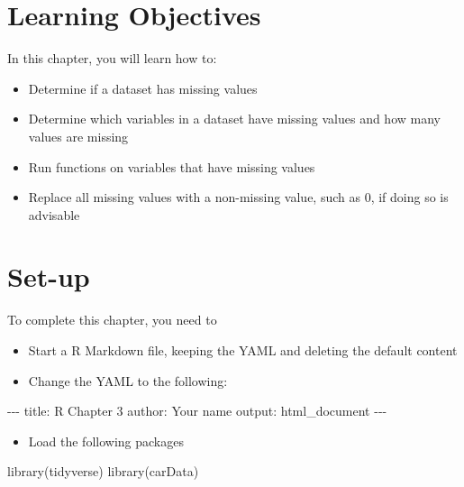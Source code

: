 \documentclass[
]{book}
\makeatletter
\newenvironment{Shaded}{\begin{snugshade}}{\end{snugshade}}
\newcommand{\FunctionTok}[1]{\textcolor[rgb]{0,0,0}{#1}}
\newcommand{\NormalTok}[1]{#1}
\newcommand{\SpecialCharTok}[1]{\textcolor[rgb]{0,0,0}{#1}}
\newcommand{\StringTok}[1]{\textcolor[rgb]{0.5,0.5,0.5}{#1}}
\providecommand{\tightlist}{%
  \setlength{\itemsep}{0pt}\setlength{\parskip}{0pt}}
\newenvironment{kframe}{%
\medskip{}
\setlength{\fboxsep}{.8em}
 \def\at@end@of@kframe{}%
 \ifinner\ifhmode%
  \def\at@end@of@kframe{\end{minipage}}%
  \begin{minipage}{\columnwidth}%
 \fi\fi%
 \def\FrameCommand##1{\hskip\@totalleftmargin \hskip-\fboxsep
 \colorbox{shadecolor}{##1}\hskip-\fboxsep
     \hskip-\linewidth \hskip-\@totalleftmargin \hskip\columnwidth}%
 \MakeFramed {\advance\hsize-\width
   \@totalleftmargin\z@ \linewidth\hsize
   \@setminipage}}%
 {\par\unskip\endMakeFramed%
 \at@end@of@kframe}
\renewenvironment{Shaded}{\begin{kframe}}{\end{kframe}}
\makeatother
\begin{document}
\hypertarget{learning-objectives}{%
\section{Learning Objectives}\label{learning-objectives}}

In this chapter, you will learn how to:

\begin{itemize}
\tightlist
\item
  Determine if a dataset has missing values
\item
  Determine which variables in a dataset have missing values and how many values are missing
\item
  Run functions on variables that have missing values
\item
  Replace all missing values with a non-missing value, such as 0, if doing so is advisable
\end{itemize}

\hypertarget{set-up}{%
\section{Set-up}\label{set-up}}

To complete this chapter, you need to

\begin{itemize}
\item
  Start a R Markdown file, keeping the YAML and deleting the default content
\item
  Change the YAML to the following:
\end{itemize}

\begin{Shaded}
\begin{Highlighting}[]
\SpecialCharTok{{-}{-}{-}}
\NormalTok{title}\SpecialCharTok{:} \StringTok{\textquotesingle{}R Chapter 3\textquotesingle{}}
\NormalTok{author}\SpecialCharTok{:} \StringTok{\textquotesingle{}Your name\textquotesingle{}}
\NormalTok{output}\SpecialCharTok{:}\NormalTok{ html\_document}
\SpecialCharTok{{-}{-}{-}}
\end{Highlighting}
\end{Shaded}

\begin{itemize}
\tightlist
\item
  Load the following packages
\end{itemize}

\begin{Shaded}
\begin{Highlighting}[]
\FunctionTok{library}\NormalTok{(tidyverse)}
\FunctionTok{library}\NormalTok{(carData)}
\end{Highlighting}
\end{Shaded}
\end{document}
